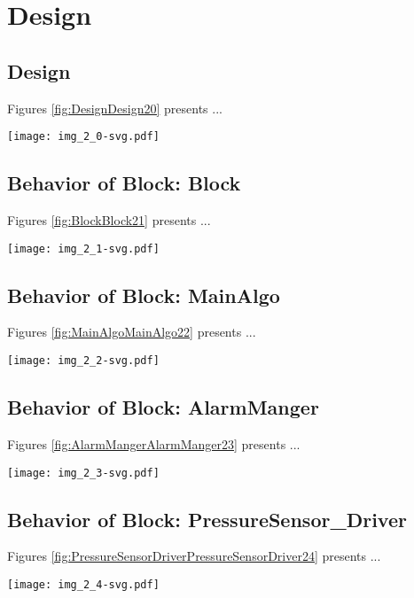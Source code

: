 \section{Design}
\subsection{Design}
Figures \ref{fig:DesignDesign20} presents ...
\begin{figure*}[htb]
\centering
\texttt{[image: img\_2\_0-svg.pdf]}
\caption{Diagram "Design"}
\label{fig:DesignDesign20}
\end{figure*}

\subsection{Behavior of Block: Block}
Figures \ref{fig:BlockBlock21} presents ...
\begin{figure*}[htb]
\centering
\texttt{[image: img\_2\_1-svg.pdf]}
\caption{Diagram "Behavior of Block: Block"}
\label{fig:BlockBlock21}
\end{figure*}

\subsection{Behavior of Block: MainAlgo}
Figures \ref{fig:MainAlgoMainAlgo22} presents ...
\begin{figure*}[htb]
\centering
\texttt{[image: img\_2\_2-svg.pdf]}
\caption{Diagram "Behavior of Block: MainAlgo"}
\label{fig:MainAlgoMainAlgo22}
\end{figure*}

\subsection{Behavior of Block: AlarmManger}
Figures \ref{fig:AlarmMangerAlarmManger23} presents ...
\begin{figure*}[htb]
\centering
\texttt{[image: img\_2\_3-svg.pdf]}
\caption{Diagram "Behavior of Block: AlarmManger"}
\label{fig:AlarmMangerAlarmManger23}
\end{figure*}

\subsection{Behavior of Block: PressureSensor\_Driver}
Figures \ref{fig:PressureSensorDriverPressureSensorDriver24} presents ...
\begin{figure*}[htb]
\centering
\texttt{[image: img\_2\_4-svg.pdf]}
\caption{Diagram "Behavior of Block: PressureSensor\_Driver"}
\label{fig:PressureSensorDriverPressureSensorDriver24}
\end{figure*}

